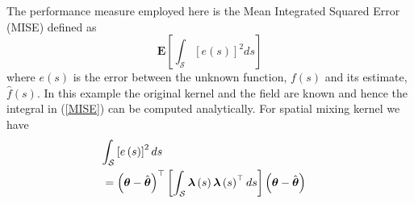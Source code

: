 \documentclass[journal,a4paper]{IEEEtran}
\begin{document}
 The performance measure employed here is the Mean Integrated Squared Error (MISE) defined as
\begin{equation}
 \mathbf{E}\left[\int_{\mathcal{S}}\left[e\left(s\right) \right]^2ds  \right]
\label{MISE} 
\end{equation}
 where  $e\left(s\right)$ is the error between the unknown function, $f\left( s\right) $ and its estimate, $\hat{f}\left( s\right) $. In this example the original kernel and the field are known and hence the integral in  (\ref{MISE}) can be computed analytically. For spatial mixing kernel we have
\begin{eqnarray}
 \lefteqn{\int_{\mathcal{S}}\left[e\left(s\right)\right]^2ds}\nonumber \\  &=\left(\boldsymbol{\theta}-\hat{\boldsymbol{\theta}}\right)^\top\left[ \int_{\mathcal{S}}\boldsymbol\lambda\left(s\right)\boldsymbol\lambda\left(s\right)^\top ds\right] \left(\boldsymbol{\theta}-\hat{\boldsymbol{\theta}}\right)&
\label{MISEKernel}
\end{eqnarray}
\end{document}
